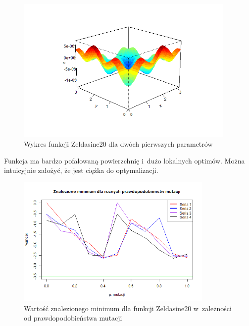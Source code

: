 \documentclass[11pt, a4paper]{article}
\newcommand{\fbi}{\leavevmode{\parindent=1em\indent}}
\begin{document}
\begin{figure}[H]
	\begin{center}
		\includegraphics[width=0.95\textwidth]{./assets/Zeldasine201.png}
		\caption{Wykres funkcji Zeldasine20 dla dwóch pierwszych parametrów}
		\label{fig:zeldasine1}
	\end{center}
\end{figure}

\fbi
Funkcja ma bardzo pofalowaną powierzchnię i~dużo lokalnych optimów. Można intuicyjnie założyć, że jest ciężka do optymalizacji.

\begin{figure}[H]
	\begin{center}
		\includegraphics[width=0.85\textwidth]{./assets/Zeldasine202.png}
		\caption{Wartość znalezionego minimum dla funkcji Zeldasine20 w~zależności od prawdopodobieństwa mutacji}
		\label{fig:zeldasine2}
	\end{center}
\end{figure}
\end{document}
